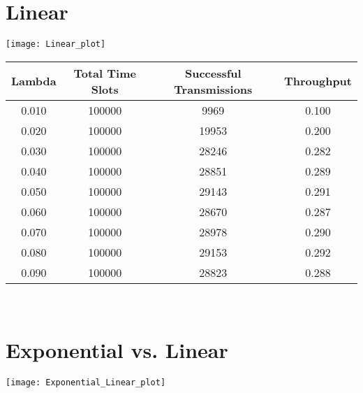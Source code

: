 \documentclass{article}
\begin{document}
\section*{Linear}
\begin{center}
\texttt{[image: Linear\_plot]}
\begin{tabular}{c | c | c | c}
	Lambda    & Total Time Slots & Successful Transmissions & Throughput \\
	\hline
	0.010     & 100000    & 9969      & 0.100     \\
	0.020     & 100000    & 19953     & 0.200     \\
	0.030     & 100000    & 28246     & 0.282     \\
	0.040     & 100000    & 28851     & 0.289     \\
	0.050     & 100000    & 29143     & 0.291     \\
	0.060     & 100000    & 28670     & 0.287     \\
	0.070     & 100000    & 28978     & 0.290     \\
	0.080     & 100000    & 29153     & 0.292     \\
	0.090     & 100000    & 28823     & 0.288     \\
\end{tabular} \\
\end{center}

\section*{Exponential vs. Linear}
\begin{center}
\texttt{[image: Exponential\_Linear\_plot]}
\end{center}
\end{document}
